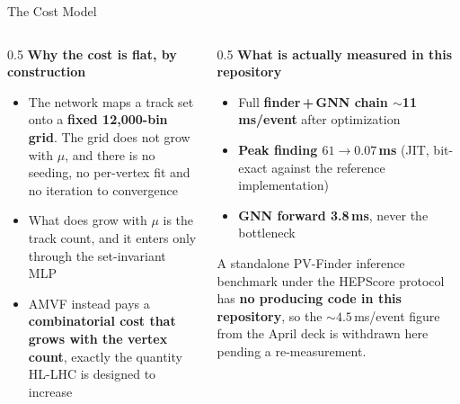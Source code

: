 \documentclass[xcolor=table,aspectratio=169]{beamer}
\begin{document}
\begin{frame}{The Cost Model}
    \begin{columns}[t]
        \begin{column}{0.5\linewidth}
            \small
            \textbf{Why the cost is flat, by construction}
            \begin{itemize}
                \setlength\itemsep{0.3em}
                \item The network maps a track set onto a \textbf{fixed 12{,}000-bin
                    grid}. The grid does not grow with $\mu$, and there is no seeding,
                    no per-vertex fit and no iteration to convergence
                \item What does grow with $\mu$ is the track count, and it enters only
                    through the set-invariant MLP
                \item AMVF instead pays a \textbf{combinatorial cost that grows with the
                    vertex count}, exactly the quantity HL-LHC is designed to increase
            \end{itemize}
        \end{column}
        \begin{column}{0.5\linewidth}
            \small
            \textbf{What is actually measured in this repository}
            \begin{itemize}
                \setlength\itemsep{0.3em}
                \item Full \textbf{finder\,+\,GNN chain $\sim$11\,ms/event} after
                    optimization
                \item \textbf{Peak finding $61 \to 0.07$\,ms} (JIT, bit-exact against
                    the reference implementation)
                \item \textbf{GNN forward 3.8\,ms}, never the bottleneck
            \end{itemize}
            \vspace{0.5em}
            {\footnotesize\textcolor{pennred}{A standalone PV-Finder inference
            benchmark under the HEPScore protocol has \textbf{no producing code in this
            repository}, so the ${\sim}4.5$\,ms/event figure from the April deck is
            withdrawn here pending a re-measurement.}}
        \end{column}
    \end{columns}
\end{frame}
\end{document}
